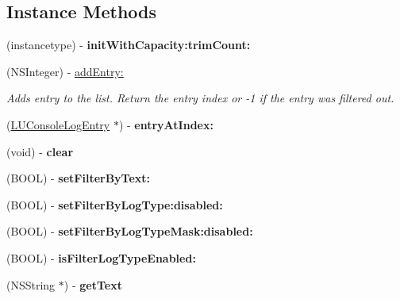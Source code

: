 \subsection*{Instance Methods}
\begin{DoxyCompactItemize}
\item 
\mbox{\label{interface_l_u_console_log_entry_list_a968c3f2e60de07884183de140d1ab2d4}} 
(instancetype) -\/ {\bfseries init\+With\+Capacity\+:trim\+Count\+:}
\item 
\mbox{\label{interface_l_u_console_log_entry_list_a18d4c08b0275227e12500c0a09172fa3}} 
(N\+S\+Integer) -\/ \mbox{\hyperlink{interface_l_u_console_log_entry_list_a18d4c08b0275227e12500c0a09172fa3}{add\+Entry\+:}}
\begin{DoxyCompactList}\small\item\em Adds entry to the list. Return the entry index or -\/1 if the entry was filtered out. \end{DoxyCompactList}\item 
\mbox{\label{interface_l_u_console_log_entry_list_a64fdfc29cb1de16e20e54427f627fd11}} 
(\mbox{\hyperlink{interface_l_u_console_log_entry}{L\+U\+Console\+Log\+Entry}} $\ast$) -\/ {\bfseries entry\+At\+Index\+:}
\item 
\mbox{\label{interface_l_u_console_log_entry_list_a79833c691f1d5593322220b8330307b2}} 
(void) -\/ {\bfseries clear}
\item 
\mbox{\label{interface_l_u_console_log_entry_list_a8ad1d734a1ca3fe9728f28925a826957}} 
(B\+O\+OL) -\/ {\bfseries set\+Filter\+By\+Text\+:}
\item 
\mbox{\label{interface_l_u_console_log_entry_list_a38ce7a82497c41ba4aaadb199fd22200}} 
(B\+O\+OL) -\/ {\bfseries set\+Filter\+By\+Log\+Type\+:disabled\+:}
\item 
\mbox{\label{interface_l_u_console_log_entry_list_a68e4115ba9a0a7f958c0969fdadd280b}} 
(B\+O\+OL) -\/ {\bfseries set\+Filter\+By\+Log\+Type\+Mask\+:disabled\+:}
\item 
\mbox{\label{interface_l_u_console_log_entry_list_aa44b65198b229da2f5c87cd2b935d84a}} 
(B\+O\+OL) -\/ {\bfseries is\+Filter\+Log\+Type\+Enabled\+:}
\item 
\mbox{\label{interface_l_u_console_log_entry_list_a8e2f1b9b08a558515cb5948afe51c1b1}} 
(N\+S\+String $\ast$) -\/ {\bfseries get\+Text}
\end{DoxyCompactItemize}
